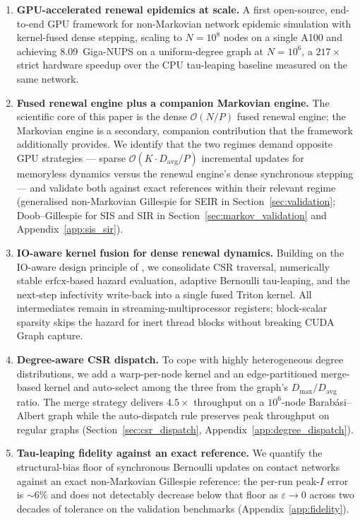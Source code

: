 \documentclass[a4paper,fleqn]{cas-sc}
\theoremstyle{definition}
\theoremstyle{remark}
\newcommand{\bigO}{\mathcal{O}}
\begin{document}
\begin{enumerate}
    \item \textbf{GPU-accelerated renewal epidemics at scale.} A first open-source, end-to-end GPU framework for non-Markovian network epidemic simulation with kernel-fused dense stepping, scaling to $N = 10^8$ nodes on a single A100 and achieving 8.09~Giga-NUPS on a uniform-degree graph at $N = 10^6$, a $217\times$ strict hardware speedup over the CPU tau-leaping baseline measured on the same network.

    \item \textbf{Fused renewal engine plus a companion Markovian engine.} The scientific core of this paper is the dense $\bigO(N/P)$ fused renewal engine; the Markovian engine is a secondary, companion contribution that the framework additionally provides. We identify that the two regimes demand opposite GPU strategies --- sparse $\bigO(K \cdot D_{\mathrm{avg}}/P)$ incremental updates for memoryless dynamics versus the renewal engine's dense synchronous stepping --- and validate both against exact references within their relevant regime (generalised non-Markovian Gillespie for SEIR in Section~\ref{sec:validation}; Doob--Gillespie for SIS and SIR in Section~\ref{sec:markov_validation} and Appendix~\ref{app:sis_sir}).

    \item \textbf{IO-aware kernel fusion for dense renewal dynamics.} Building on the IO-aware design principle of \citet{dao2022flashattention}, we consolidate CSR traversal, numerically stable $\mathrm{erfcx}$-based hazard evaluation, adaptive Bernoulli tau-leaping, and the next-step infectivity write-back into a single fused Triton kernel. All intermediates remain in streaming-multiprocessor registers; block-scalar sparsity skips the hazard for inert thread blocks without breaking CUDA Graph capture.

    \item \textbf{Degree-aware CSR dispatch.} To cope with highly heterogeneous degree distributions, we add a warp-per-node kernel and an edge-partitioned merge-based kernel \citep{merrill2016merge} and auto-select among the three from the graph's $D_{\max}/D_{\mathrm{avg}}$ ratio. The merge strategy delivers $4.5\times$ throughput on a $10^6$-node Barab\'{a}si--Albert graph while the auto-dispatch rule preserves peak throughput on regular graphs (Section~\ref{sec:csr_dispatch}, Appendix~\ref{app:degree_dispatch}).

    \item \textbf{Tau-leaping fidelity against an exact reference.} We quantify the structural-bias floor of synchronous Bernoulli updates on contact networks against an exact non-Markovian Gillespie reference: the per-run peak-$I$ error is $\sim$6\% and does not detectably decrease below that floor as $\varepsilon \to 0$ across two decades of tolerance on the validation benchmarks (Appendix~\ref{app:fidelity}).


\end{enumerate}
\end{document}

